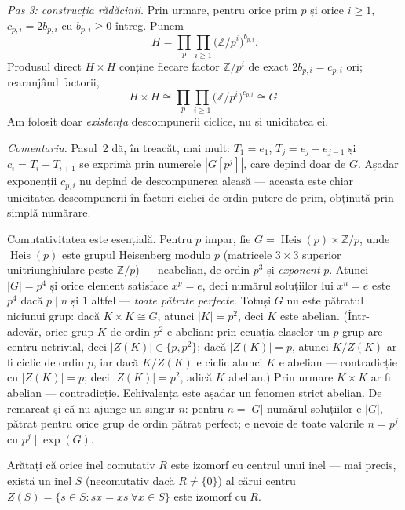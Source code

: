 \begin{solutie}
\textit{Pas 3: construcția rădăcinii.} Prin urmare, pentru orice prim
$p$ și orice $i\ge 1$, $c_{p,i}=2b_{p,i}$ cu $b_{p,i}\ge 0$ întreg.
Punem
\[
  H=\prod_{p}\prod_{i\ge 1}\bigl(\mathbb{Z}/p^{i}\bigr)^{b_{p,i}} .
\]
Produsul direct $H\times H$ conține fiecare factor $\mathbb{Z}/p^{i}$ de
exact $2b_{p,i}=c_{p,i}$ ori; rearanjând factorii,
\[
  H\times H\cong\prod_{p}\prod_{i\ge 1}\bigl(\mathbb{Z}/p^{i}\bigr)^{c_{p,i}}
  \cong G .
\]
Am folosit doar \emph{existența} descompunerii ciclice, nu și unicitatea
ei.

\smallskip
\noindent\textit{Comentariu.} Pasul~2 dă, în treacăt, mai mult:
$T_{1}=e_{1}$, $T_{j}=e_{j}-e_{j-1}$ și $c_{i}=T_{i}-T_{i+1}$ se exprimă
prin numerele $|G[p^{j}]|$, care depind doar de $G$. Așadar exponenții
$c_{p,i}$ nu depind de descompunerea aleasă --- aceasta este chiar
unicitatea descompunerii în factori ciclici de ordin putere de prim,
obținută prin simplă numărare.
\end{solutie}

\begin{obs}
Comutativitatea este esențială. Pentru $p$ impar, fie
$G=\operatorname{Heis}(p)\times\mathbb{Z}/p$, unde $\operatorname{Heis}(p)$
este grupul Heisenberg modulo $p$ (matricele $3\times 3$ superior
unitriunghiulare peste $\mathbb{Z}/p$) --- neabelian, de ordin $p^{3}$ și
\emph{exponent} $p$. Atunci $|G|=p^{4}$ și orice element satisface
$x^{p}=e$, deci numărul soluțiilor lui $x^{n}=e$ este $p^{4}$ dacă
$p\mid n$ și $1$ altfel --- \emph{toate pătrate perfecte}. Totuși
$G$ nu este pătratul niciunui grup: dacă $K\times K\cong G$, atunci
$|K|=p^{2}$, deci $K$ este abelian. (Într-adevăr, orice grup $K$ de
ordin $p^{2}$ e abelian: prin ecuația claselor un $p$-grup are centru
netrivial, deci $|Z(K)|\in\{p,p^{2}\}$; dacă $|Z(K)|=p$, atunci $K/Z(K)$
ar fi ciclic de ordin $p$, iar dacă $K/Z(K)$ e ciclic atunci $K$ e
abelian --- contradicție cu $|Z(K)|=p$; deci $|Z(K)|=p^{2}$, adică
$K$ abelian.) Prin urmare $K\times K$ ar fi abelian --- contradicție.
Echivalența este
așadar un fenomen strict abelian. De remarcat și că nu ajunge un
singur $n$: pentru $n=|G|$ numărul soluțiilor e $|G|$, pătrat
pentru orice grup de ordin pătrat perfect; e nevoie de toate valorile
$n=p^{j}$ cu $p^{j}\mid\exp(G)$.
\end{obs}

\begin{problema}
Arătați că orice inel comutativ $R$ este izomorf cu centrul unui
inel --- mai precis, există un inel $S$ (necomutativ dacă $R\neq\{0\}$)
al cărui centru $Z(S)=\{s\in S : sx=xs\ \forall x\in S\}$ este izomorf cu
$R$.
\end{problema}


